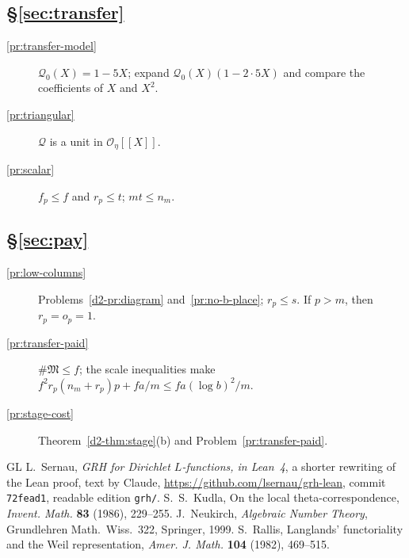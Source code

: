 \documentclass[reqno]{amsart}
\theoremstyle{plain}
\theoremstyle{definition}
\theoremstyle{remark}
\newcommand{\Oc}{\mathcal O}
\newcommand{\Qc}{\mathcal Q}
\newcommand{\Mk}{\mathfrak M}
\begin{document}
\subsection*{\S\ref{sec:transfer}}
\begin{description}
\item[\ref{pr:transfer-model}] \(\Qc_0(X) = 1 - 5X\); expand \(\Qc_0(X)(1 - 2\cdot 5X)\) and compare the coefficients of \(X\) and \(X^2\).
\item[\ref{pr:triangular}] \(\Qc\) is a unit in \(\Oc_\eta[[X]]\).
\item[\ref{pr:scalar}] \(f_p \le f\) and \(r_p \le t\); \(mt \le n_m\).
\end{description}

\subsection*{\S\ref{sec:pay}}
\begin{description}
\item[\ref{pr:low-columns}] Problems~\ref{d2-pr:diagram} and~\ref{pr:no-b-place}; \(r_p \le s\).  If \(p > m\), then \(r_p = o_p = 1\).
\item[\ref{pr:transfer-paid}] \(\#\Mk \le f\); the scale inequalities make \(f^2 r_p(n_m + r_p)p + fa/m \le fa(\log b)^2/m\).
\item[\ref{pr:stage-cost}] Theorem~\ref{d2-thm:stage}(b) and Problem~\ref{pr:transfer-paid}.
\end{description}

\begin{thebibliography}{GL}
 L.~Sernau, \emph{GRH for Dirichlet \(L\)-functions, in Lean~4}, a shorter rewriting of the Lean proof, text by Claude, \url{https://github.com/lsernau/grh-lean}, commit \texttt{72fead1}, readable edition \texttt{grh/}.
 S.~S.~Kudla, On the local theta-correspondence, \emph{Invent. Math.} \textbf{83} (1986), 229--255.
 J.~Neukirch, \emph{Algebraic Number Theory}, Grundlehren Math.\ Wiss.\ 322, Springer, 1999.
 S.~Rallis, Langlands' functoriality and the Weil representation, \emph{Amer. J. Math.} \textbf{104} (1982), 469--515.
\end{thebibliography}
\end{document}
